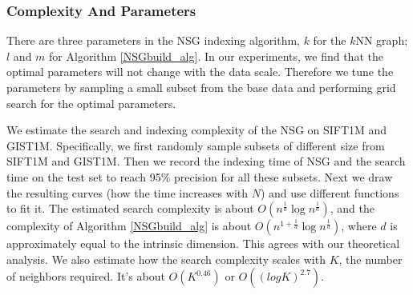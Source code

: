 \documentclass{vldb}
\begin{document}




\subsubsection{Complexity And Parameters}
There are three parameters in the NSG indexing algorithm, $k$ for the $k$NN graph; $l$ and $m$ for Algorithm \ref{NSGbuild_alg}. In our experiments, we find that the optimal parameters will not change with the data scale. Therefore we tune the parameters by sampling a small subset from the base data and performing grid search for the optimal parameters.

We estimate the search and indexing complexity of the NSG on SIFT1M and GIST1M. Specifically, we first randomly sample subsets of different size from SIFT1M and GIST1M. Then we record the indexing time of NSG and the search time on the test set to reach 95\% precision for all these subsets. Next we draw the resulting curves (how the time increases with $N$) and use different functions to fit it. The estimated search complexity is about $O(n^{\frac{1}{d}}\log n^{\frac{1}{d}})$, and the complexity of Algorithm \ref{NSGbuild_alg} is about $O(n^{1+\frac{1}{d}}\log n^{\frac{1}{d}})$, where $d$ is approximately equal to the intrinsic dimension. This agrees with our theoretical analysis. We also estimate how the search complexity scales with $K$, the number of neighbors required. It's about $O(K^{0.46})$ or $O((logK)^{2.7})$.
\end{document}
